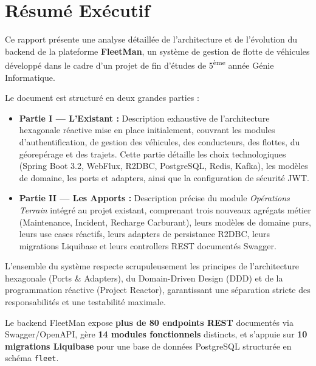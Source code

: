 \documentclass[12pt,a4paper]{report}
\begin{document}
\chapter*{Résumé Exécutif}
\thispagestyle{fancy}

Ce rapport présente une analyse détaillée de l'architecture et de l'évolution du backend de la plateforme \textbf{FleetMan}, un système de gestion de flotte de véhicules développé dans le cadre d'un projet de fin d'études de 5\textsuperscript{ème} année Génie Informatique.

Le document est structuré en deux grandes parties :

\begin{itemize}[leftmargin=2cm]
  \item \textbf{Partie I — L'Existant :} Description exhaustive de l'architecture hexagonale réactive mise en place initialement, couvrant les modules d'authentification, de gestion des véhicules, des conducteurs, des flottes, du géorepérage et des trajets. Cette partie détaille les choix technologiques (Spring Boot 3.2, WebFlux, R2DBC, PostgreSQL, Redis, Kafka), les modèles de domaine, les ports et adapters, ainsi que la configuration de sécurité JWT.

  \item \textbf{Partie II — Les Apports :} Description précise du module \textit{Opérations Terrain} intégré au projet existant, comprenant trois nouveaux agrégats métier (Maintenance, Incident, Recharge Carburant), leurs modèles de domaine purs, leurs use cases réactifs, leurs adapters de persistance R2DBC, leurs migrations Liquibase et leurs controllers REST documentés Swagger.
\end{itemize}

L'ensemble du système respecte scrupuleusement les principes de l'architecture hexagonale (Ports \& Adapters), du Domain-Driven Design (DDD) et de la programmation réactive (Project Reactor), garantissant une séparation stricte des responsabilités et une testabilité maximale.

\vspace{1cm}
\begin{successbox}[title={Résultat Global}]
Le backend FleetMan expose \textbf{plus de 80 endpoints REST} documentés via Swagger/OpenAPI, gère \textbf{14 modules fonctionnels} distincts, et s'appuie sur \textbf{10 migrations Liquibase} pour une base de données PostgreSQL structurée en schéma \texttt{fleet}.
\end{successbox}
\end{document}
